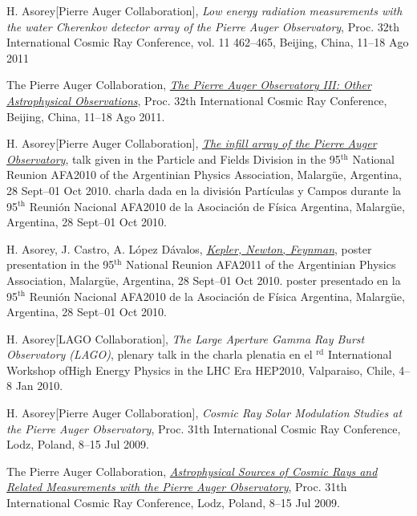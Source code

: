 \begin{etaremune}
\item {}H. Asorey[Pierre Auger Collaboration], {\emph{Low energy radiation
measurements with the water Cherenkov detector array of the Pierre Auger
Observatory}}, \en Proc. 32th International Cosmic Ray Conference, vol. 11
462--465, Beijing, China, 11--18 Ago 2011

\item {}The Pierre Auger Collaboration,
\href{http://arxiv.org/abs/1107.4805}{\emph{The Pierre Auger Observatory III:
Other Astrophysical Observations}}, \en Proc. 32th International Cosmic Ray
Conference, Beijing, China, 11--18 Ago 2011.

\item {}H. Asorey[Pierre Auger Collaboration],
\href{http://95rnf.afa.webfactional.com/tex\_files/Resumenes/DPyC/PyC\_6.pdf}{\emph{The
infill array of the Pierre Auger Observatory}}, 
\ifeng
talk given in the Particle and Fields Division in the 95$^{\mathrm{th}}$ National Reunion AFA2010 of the Argentinian Physics Association, Malargüe, Argentina, 28 Sept--01 Oct 2010.
\else
charla dada en la división Partículas y Campos durante la 95$^{\mathrm{th}}$ Reunión Nacional AFA2010 de la Asociación de Física Argentina, Malargüe, Argentina, 28 Sept--01 Oct 2010.
\fi

\item {}H. Asorey, J. Castro, A. López Dávalos,
\href{http://95rnf.afa.webfactional.com/tex\_files/Resumenes/EF/asorey.pdf}{\emph{Kepler,
Newton, Feynman}}, 
\ifeng
poster presentation in the 95$^{\mathrm{th}}$ National Reunion AFA2011 of the Argentinian Physics Association, Malargüe, Argentina, 28 Sept--01 Oct 2010.
\else
poster presentado en la 95$^{\mathrm{th}}$ Reunión Nacional AFA2010 de la Asociación de Física Argentina, Malargüe, Argentina, 28 Sept--01 Oct 2010.
\fi

\item {}H. Asorey[LAGO Collaboration], {\emph{The Large Aperture Gamma Ray Burst Observatory (LAGO)}}, 
\ifeng
plenary talk in the 
\else
charla plenatia en el 
$^{\mathrm{rd}}$ International Workshop ofHigh Energy Physics in the LHC Era HEP2010, Valparaiso, Chile, 4--8 Jan 2010.

\item {}H. Asorey[Pierre Auger Collaboration], {\emph{Cosmic Ray Solar
Modulation Studies at the Pierre Auger Observatory}}, \en Proc. 31th
International Cosmic Ray Conference, Lodz, Poland, 8--15 Jul 2009.

\item {}The Pierre Auger Collaboration,
\href{http://arxiv.org/abs/0906.2347}{\emph{Astrophysical Sources of Cosmic
Rays and Related Measurements with the Pierre Auger Observatory}}, \en Proc.
31th International Cosmic Ray Conference, Lodz, Poland, 8--15 Jul 2009.


\end{etaremune}

